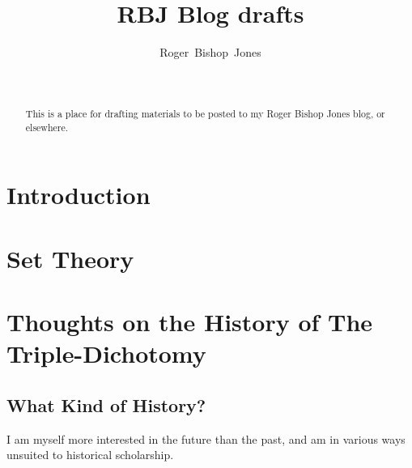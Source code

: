 \documentclass[10pt,titlepage]{article}
\title{RBJ Blog drafts}
\author{Roger~Bishop~Jones}
\date{\ }
\begin{document}
                               
\begin{titlepage}
\maketitle

\begin{abstract}
This is a place for drafting materials to be posted to my Roger Bishop Jones blog, or elsewhere.
\end{abstract}





\end{titlepage}

\setcounter{tocdepth}{2}
{\parskip-0pt\tableofcontents}



\section{Introduction}



\section{Set Theory}

\subsection{}

\section{Thoughts on the History of The Triple-Dichotomy}

\subsection{What Kind of History?}

I am myself more interested in the future than the past, and am in various ways unsuited to historical scholarship.
\end{document}
